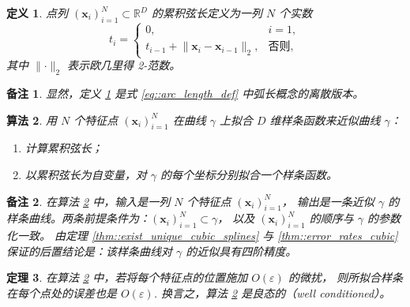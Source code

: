 \documentclass[a4paper]{ctexart}
\newtheorem{theorem}{定理}
\newtheorem{remark}{备注}
\newtheorem{definition}[theorem]{定义} %
\newtheorem{algorithm}[theorem]{算法}
\numberwithin{theorem}{section}
\numberwithin{equation}{section}
\numberwithin{figure}{section}
\numberwithin{remark}{section}
\begin{document}
\begin{definition}
    \label{def::cumulative_chordal_lengths}
点列 $(\mathbf{x}_i)_{i=1}^{N}\subset\mathbb{R}^{D}$ 的累积弦长定义为一列 $N$ 个实数
\begin{equation}
    \label{eq::cumulative_chordal} 
t_i=
\begin{cases}
0, & i=1,\\[4pt]
t_{i-1}+\lVert\mathbf{x}_i-\mathbf{x}_{i-1}\rVert_{2}, & \text{否则},
\end{cases}
\end{equation}
其中 $\lVert\cdot\rVert_{2}$ 表示欧几里得 2-范数。
\end{definition}

\begin{remark}
显然，定义 \ref{def::cumulative_chordal_lengths} 是式 \eqref{eq::arc_length_def} 中弧长概念的离散版本。
\end{remark}

\begin{algorithm}
    \label{alg::curve_fit_chordal}
用 $N$ 个特征点 $(\mathbf{x}_i)_{i=1}^{N}$ 在曲线 $\gamma$ 上拟合 $D$ 维样条函数来近似曲线 $\gamma$：
\begin{enumerate}
    \item 计算累积弦长；
    \item 以累积弦长为自变量，对 $\gamma$ 的每个坐标分别拟合一个样条函数。
\end{enumerate}
\end{algorithm}

\begin{remark}
在算法 \ref{alg::curve_fit_chordal} 中，输入是一列 $N$ 个特征点 $(\mathbf{x}_i)_{i=1}^{N}$，
输出是一条近似 $\gamma$ 的样条曲线。两条前提条件为：$(\mathbf{x}_i)_{i=1}^{N}\subset\gamma$，
以及 $(\mathbf{x}_i)_{i=1}^{N}$ 的顺序与 $\gamma$ 的参数化一致。
由定理 \ref{thm::exist_unique_cubic_splines} 与 \ref{thm::error_rates_cubic} 保证的后置结论是：该样条曲线对 $\gamma$ 的近似具有四阶精度。
\end{remark}

\begin{theorem}
    \label{thm::alg365_stability}
在算法 \ref{alg::curve_fit_chordal} 中，若将每个特征点的位置施加 $O(\varepsilon)$ 的微扰，
则所拟合样条在每个点处的误差也是 $O(\varepsilon)$. 换言之，算法 \ref{alg::curve_fit_chordal} 是良态的（well conditioned）。
\end{theorem}
\end{document}
